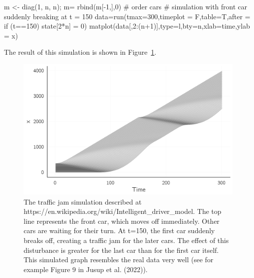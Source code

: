 \documentclass[
  a4paper,
  DIV=11,
  numbers=noendperiod,
  oneside]{scrreprt}
\newenvironment{Shaded}{\begin{snugshade}}{\end{snugshade}}
\newcommand{\AttributeTok}[1]{\textcolor[rgb]{0.40,0.45,0.13}{#1}}
\newcommand{\CommentTok}[1]{\textcolor[rgb]{0.37,0.37,0.37}{#1}}
\newcommand{\DecValTok}[1]{\textcolor[rgb]{0.68,0.00,0.00}{#1}}
\newcommand{\FunctionTok}[1]{\textcolor[rgb]{0.28,0.35,0.67}{#1}}
\newcommand{\NormalTok}[1]{\textcolor[rgb]{0.00,0.23,0.31}{#1}}
\newcommand{\OtherTok}[1]{\textcolor[rgb]{0.00,0.23,0.31}{#1}}
\newcommand{\SpecialCharTok}[1]{\textcolor[rgb]{0.37,0.37,0.37}{#1}}
\newcommand{\StringTok}[1]{\textcolor[rgb]{0.13,0.47,0.30}{#1}}
\begin{document}
\begin{Shaded}
\begin{Highlighting}[]
\NormalTok{m }\OtherTok{\textless{}{-}} \FunctionTok{diag}\NormalTok{(}\DecValTok{1}\NormalTok{, n, n); m}\OtherTok{=} \FunctionTok{rbind}\NormalTok{(m[}\SpecialCharTok{{-}}\DecValTok{1}\NormalTok{,],}\DecValTok{0}\NormalTok{) }\CommentTok{\# order cars}
\CommentTok{\# simulation with front car suddenly breaking at t = 150}
\NormalTok{data}\OtherTok{=}\FunctionTok{run}\NormalTok{(}\AttributeTok{tmax=}\DecValTok{300}\NormalTok{,}\AttributeTok{timeplot =}\NormalTok{ F,}\AttributeTok{table=}\NormalTok{T,}\AttributeTok{after =} \StringTok{\textquotesingle{}if (t==150) state[2*n] = 0\textquotesingle{}}\NormalTok{)}
\FunctionTok{matplot}\NormalTok{(data[,}\DecValTok{2}\SpecialCharTok{:}\NormalTok{(n}\SpecialCharTok{+}\DecValTok{1}\NormalTok{)],}\AttributeTok{type=}\StringTok{\textquotesingle{}l\textquotesingle{}}\NormalTok{,}\AttributeTok{bty=}\StringTok{\textquotesingle{}n\textquotesingle{}}\NormalTok{,}\AttributeTok{xlab=}\StringTok{\textquotesingle{}time\textquotesingle{}}\NormalTok{,}\AttributeTok{ylab =} \StringTok{\textquotesingle{}x\textquotesingle{}}\NormalTok{)}
\end{Highlighting}
\end{Shaded}

The result of this simulation is shown in
Figure~\ref{fig-ch4n-img6-old-54}.

\begin{figure}

{\centering \includegraphics{media/ch4n/fig-ch4n-img6-old-54.png}

}

\caption{\label{fig-ch4n-img6-old-54}The traffic jam simulation
described at https://en.wikipedia.org/wiki/Intelligent\_driver\_model.
The top line represents the front car, which moves off immediately.
Other cars are waiting for their turn. At t=150, the first car suddenly
breaks off, creating a traffic jam for the later cars. The effect of
this disturbance is greater for the last car than for the first car
itself. This simulated graph resembles the real data very well (see for
example Figure 9 in Jusup et al. (2022)).}

\end{figure}
\end{document}
